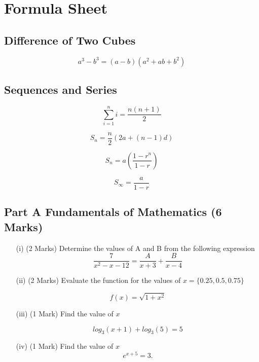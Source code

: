 \documentclass[11pt]{article} %
\begin{document}

\newpage


\LARGE
\section*{Formula Sheet}

\subsection*{Difference of Two Cubes}
\[ a^3 - b^3 = (a-b)(a^2 + ab + b^2)\]
\subsection*{Sequences and Series}
\[ \sum_{i=1}^{n} i = \frac{n(n+1)}{2}\]

\[ S_n = \frac{n}{2} \left(2a + (n-1) d \right)\]

\[ S_n = a\left(\frac{1-r^n}{1-r}\right)\]

\[ S_\infty = \frac{a}{1-r}\]
\newpage


\subsection*{Part A Fundamentals of Mathematics (6 Marks) } %

\begin{itemize}
	
	\item[(i)] (2 Marks) Determine the values of A and B from the following expression
	\[  \frac{7}{x^2-x-12} = \frac{A}{x+3} + \frac{B}{x-4}\]
	\vspace{1.5cm}
	
	\item[(ii)] (2 Marks) Evaluate the function for the values of  $ x = \{0.25, 0.5 , 0.75 \}$
	
	\[  f(x) = \sqrt{1+x^2} \]
	

	\vspace{1.8cm}
	\newpage
	
	\item [(iii)](1 Mark) Find the value of $x$
	
	\[log_3(x + 1) + log_3(5) = 5\]
	
		
		\vspace{1.8cm}
		
	\item[(iv)] (1 Mark) Find the value of $x$
		\[e^{x+5} = 3. \]
	
\end{itemize}
\end{document}
